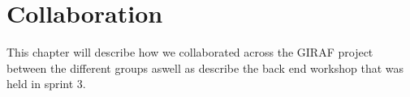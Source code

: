 \chapter{Collaboration}
This chapter will describe how we collaborated across the GIRAF project between the different groups aswell as describe the back end workshop that was held in sprint 3.